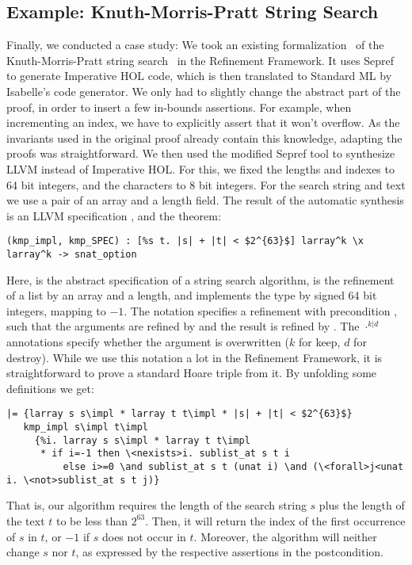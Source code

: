 \documentclass[a4paper,oribibl,envcountsame]{llncs}
\begin{document}
\subsection{Example: Knuth-Morris-Pratt String Search}
Finally, we conducted a case study: 
We took an existing formalization~\cite{HeLa17} of the Knuth-Morris-Pratt string search~\cite{KMP77} in the Refinement Framework.
It uses Sepref to generate Imperative HOL code, which is then translated to Standard ML by Isabelle's code generator.
We only had to slightly change the abstract part of the proof, in order to insert a few in-bounds assertions. 
For example, when incrementing an index, we have to explicitly assert that it won't overflow. 
As the invariants used in the original proof already contain this knowledge, adapting the proofs was straightforward.
We then used the modified Sepref tool to synthesize LLVM instead of Imperative HOL. 
For this, we fixed the lengths and indexes to 64 bit integers, and the characters to 8 bit integers.
For the search string and text we use a pair of an array and a length field.
The result of the automatic synthesis is an LLVM specification , and the theorem:
\begin{lstlisting}
(kmp_impl, kmp_SPEC) : [%s t. |s| + |t| < $2^{63}$] larray^k \x larray^k -> snat_option
\end{lstlisting}
Here,  is the abstract specification of a string search algorithm,  is 
the refinement of a list by an array and a length, and  implements the type  
by signed 64 bit integers, mapping  to $-1$. 
The notation  specifies a refinement with precondition \q{\is{\Phi}}, such that the 
arguments are refined by  and the result is refined by . 
The $\cdot^{k|d}$ annotations specify whether the argument is overwritten ($k$ for keep, $d$ for destroy).
While we use this notation a lot in the Refinement Framework, it is straightforward to prove a standard Hoare triple from it. By unfolding some definitions we get:
\begin{lstlisting}
|= {larray s s\impl * larray t t\impl * |s| + |t| < $2^{63}$}
   kmp_impl s\impl t\impl
     {%i. larray s s\impl * larray t t\impl 
      * if i=-1 then \<nexists>i. sublist_at s t i 
          else i>=0 \and sublist_at s t (unat i) \and (\<forall>j<unat i. \<not>sublist_at s t j)}
\end{lstlisting}
That is, our algorithm requires the length of the search string $s$ plus the length of the text $t$ to be less than $2^{63}$. 
Then, it will return the index of the first occurrence of $s$ in $t$, or $-1$ if $s$ does not occur in $t$. 
Moreover, the algorithm will neither change $s$ nor $t$, as expressed by the respective assertions in the postcondition.
\end{document}
